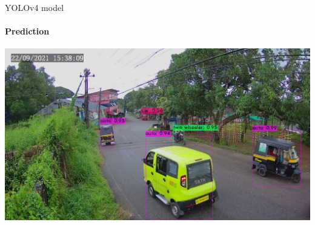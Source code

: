 \documentclass{beamer}
\begin{document}
	\begin{frame}{YOLOv4 model}
		\framesubtitle{Prediction}
		\begin{center}
			\includegraphics[width=\linewidth]{res/data_set1/predictions}
		\end{center}
	\end{frame}
\end{document}
